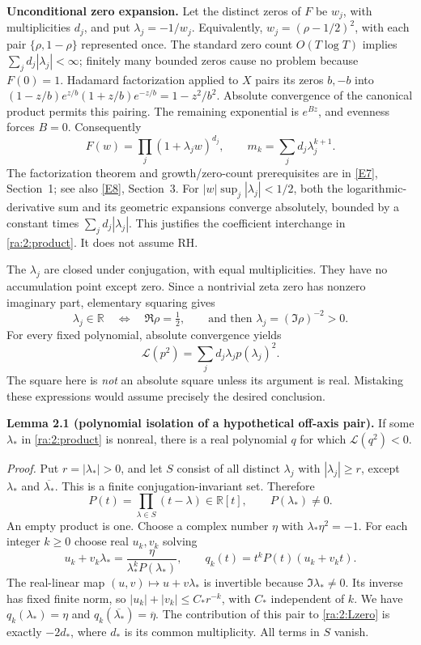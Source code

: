 \documentclass[11pt]{article}
\newcommand{\R}{\mathbb{R}}
\newcommand{\eref}[2]{\hyperlink{extra:#1:#2}{[E#2]}}
\begin{document}
\medskip
\textbf{Unconditional zero expansion.}
Let the distinct zeros of $F$ be $w_j$, with multiplicities $d_j$, and put
$\lambda_j=-1/w_j$. Equivalently, $w_j=(\rho-1/2)^2$, with each pair
$\{\rho,1-\rho\}$ represented once. The standard zero count
$O(T\log T)$ implies $\sum_jd_j|\lambda_j|<\infty$; finitely many bounded
zeros cause no problem because $F(0)=1$. Hadamard factorization applied to
$X$ pairs its zeros $b,-b$ into
$(1-z/b)e^{z/b}(1+z/b)e^{-z/b}=1-z^2/b^2$.
Absolute convergence of the canonical product permits this pairing.
The remaining exponential is $e^{Bz}$, and evenness forces $B=0$.
Consequently
\begin{equation}\label{ra:2:product}
 F(w)=\prod_j(1+\lambda_jw)^{d_j},\qquad
 m_k=\sum_jd_j\lambda_j^{k+1}.
\end{equation}
The factorization theorem and growth/zero-count prerequisites are in
\eref{2}{7}, Section~1; see also \eref{2}{8}, Section~3.
For $|w|\sup_j|\lambda_j|<1/2$, both the logarithmic-derivative sum and
its geometric expansions converge absolutely, bounded by a constant times
$\sum_jd_j|\lambda_j|$. This justifies the coefficient interchange in
\eqref{ra:2:product}. It does not assume RH.

The $\lambda_j$ are closed under conjugation, with equal multiplicities.
They have no accumulation point except zero. Since a nontrivial zeta zero
has nonzero imaginary part, elementary squaring gives
\begin{equation}\label{ra:2:lambda-location}
 \lambda_j\in\R\quad\Longleftrightarrow\quad
 \Re\rho=\tfrac12,
 \qquad\text{and then }\lambda_j=(\Im\rho)^{-2}>0.
\end{equation}
For every fixed polynomial, absolute convergence yields
\begin{equation}\label{ra:2:Lzero}
 \mathcal L(p^2)=\sum_j d_j\lambda_jp(\lambda_j)^2.
\end{equation}
The square here is \emph{not} an absolute square unless its argument is real.
Mistaking these expressions would assume precisely the desired conclusion.

\medskip
\textbf{Lemma 2.1 (polynomial isolation of a hypothetical off-axis pair).}
If some $\lambda_*$ in \eqref{ra:2:product} is nonreal, there is a real
polynomial $q$ for which $\mathcal L(q^2)<0$.

\textit{Proof.}
Put $r=|\lambda_*|>0$, and let $S$ consist of all distinct $\lambda_j$
with $|\lambda_j|\ge r$, except $\lambda_*$ and $\overline{\lambda_*}$.
This is a finite conjugation-invariant set. Therefore
\[
 P(t)=\prod_{\lambda\in S}(t-\lambda)\in\R[t],
 \qquad P(\lambda_*)\ne0.
\]
An empty product is one. Choose a complex number $\eta$ with
$\lambda_*\eta^2=-1$. For each integer $k\ge0$ choose real $u_k,v_k$ solving
\[
 u_k+v_k\lambda_*
       =\frac{\eta}{\lambda_*^kP(\lambda_*)},
 \qquad q_k(t)=t^kP(t)(u_k+v_kt).
\]
The real-linear map $(u,v)\mapsto u+v\lambda_*$ is invertible because
$\Im\lambda_*\ne0$. Its inverse has fixed finite norm, so
$|u_k|+|v_k|\le C_*r^{-k}$, with $C_*$ independent of $k$.
We have $q_k(\lambda_*)=\eta$ and
$q_k(\overline{\lambda_*})=\overline\eta$. The contribution of this pair
to \eqref{ra:2:Lzero} is exactly $-2d_*$, where $d_*$ is its common
multiplicity. All terms in $S$ vanish.
\end{document}
